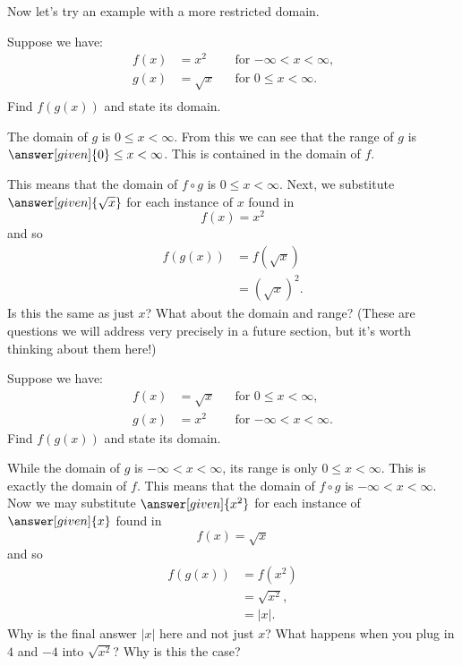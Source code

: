 \documentclass{ximera}
\begin{document}
Now let's try an example with a more restricted domain.
 
\begin{example}
    Suppose we have:
    \begin{align*}
        f(x)&=x^2       &&\text{for $-\infty< x< \infty$,}\\
        g(x)&= \sqrt{x} &&\text{for $0\le x< \infty$.}\\
    \end{align*}
    Find $f(g(x))$ and state its domain.
    \begin{explanation}
        The domain of $g$ is $0\le x< \infty$. From this we can see that the
        range of $g$ is $\answer[given]{0}\le x< \infty$. This is contained
        in the domain of $f$.
        
        This means that the domain of $f\circ g$ is $0\le x< \infty$.  Next,
        we substitute $\answer[given]{\sqrt{x}}$ for each instance of $x$
        found in
        \[
            f(x)={{x}^{2}}
        \]
        and so
        \begin{align*}
            f(g(x)) &=f(\sqrt{x})\\
                    &=\left(\sqrt{x}\right)^2.
        \end{align*}
        Is this the same as just $x$? What about the domain and range? (These are questions we will address very precisely in a future section, but it's worth thinking about them here!)
    \end{explanation}
\end{example}
 
 
\begin{example}
    Suppose we have:
    \begin{align*}
        f(x)&=\sqrt{x}  &&\text{for $0\le x< \infty$,}\\
        g(x)&= x^2      &&\text{for $-\infty< x< \infty$.}
    \end{align*}
    Find $f(g(x))$ and state its domain.
    \begin{explanation}
        While the domain of $g$ is $-\infty< x< \infty$, its range is only
        $0 \le x<\infty$. This is exactly the domain of $f$. This means that
        the domain of $f\circ g$ is $-\infty< x< \infty$. %
        Now we may substitute $\answer[given]{x^2}$ for each instance of
        $\answer[given]{x}$ found in
        \[
            f(x)=\sqrt{x}
        \]
        and so
        \begin{align*}
            f(g(x)) &=f(x^2)     \\
                    &=\sqrt{x^2},\\
                    &=|x|.
        \end{align*}
        Why is the final answer $|x|$ here and not just $x$? What happens when you plug in $4$ and $-4$ into $\sqrt{x^2}$? Why is this the case?
    \end{explanation}
\end{example}
 
\end{document}
